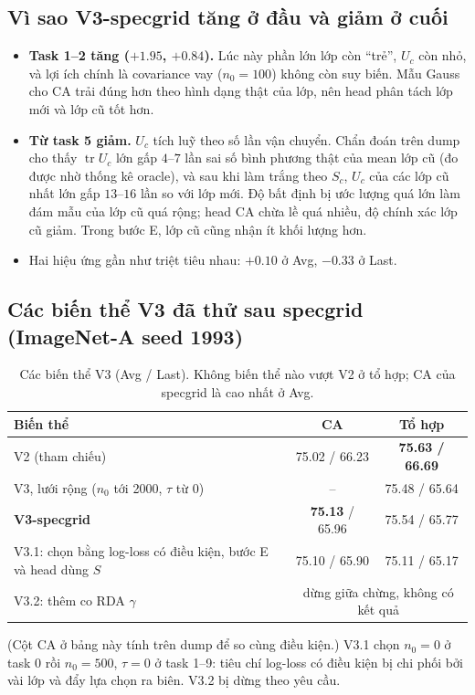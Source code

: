 \documentclass[11pt]{article}
\newcommand{\tr}{\operatorname{tr}}
\begin{document}
\subsection{Vì sao V3-specgrid tăng ở đầu và giảm ở cuối}\label{sec:why}
\begin{itemize}
\item \textbf{Task 1--2 tăng ($+1.95$, $+0.84$).} Lúc này phần lớn lớp còn ``trẻ'', $U_c$ còn nhỏ, và lợi ích chính là
      covariance vay ($n_0=100$) không còn suy biến. Mẫu Gauss cho CA trải đúng hơn theo hình dạng thật của lớp, nên head
      phân tách lớp mới và lớp cũ tốt hơn.
\item \textbf{Từ task 5 giảm.} $U_c$ tích luỹ theo số lần vận chuyển. Chẩn đoán trên dump cho thấy $\tr U_c$ lớn gấp
      $4$--$7$ lần sai số bình phương thật của mean lớp cũ (đo được nhờ thống kê oracle), và sau khi làm trắng theo
      $S_c$, $U_c$ của các lớp cũ nhất lớn gấp $13$--$16$ lần so với lớp mới. Độ bất định bị ước lượng quá lớn làm đám
      mẫu của lớp cũ quá rộng; head CA chừa lề quá nhiều, độ chính xác lớp cũ giảm. Trong bước E, lớp cũ cũng nhận ít
      khối lượng hơn.
\item Hai hiệu ứng gần như triệt tiêu nhau: $+0.10$ ở Avg, $-0.33$ ở Last.
\end{itemize}

\subsection{Các biến thể V3 đã thử sau specgrid (ImageNet-A seed 1993)}
\begin{table}[H]
\centering\small
\caption{Các biến thể V3 (Avg / Last). Không biến thể nào vượt V2 ở tổ hợp; CA của specgrid là cao nhất ở Avg.}
\begin{tabular}{lcc}
\toprule
Biến thể & CA & Tổ hợp \\
\midrule
V2 (tham chiếu) & 75.02 / 66.23 & \textbf{75.63 / 66.69} \\
V3, lưới rộng ($n_0$ tới 2000, $\tau$ từ 0) & -- & 75.48 / 65.64 \\
\textbf{V3-specgrid} & \textbf{75.13} / 65.96 & 75.54 / 65.77 \\
V3.1: chọn bằng log-loss có điều kiện, bước E và head dùng $S$ & 75.10 / 65.90 & 75.11 / 65.17 \\
V3.2: thêm co RDA $\gamma$ & \multicolumn{2}{c}{dừng giữa chừng, không có kết quả} \\
\bottomrule
\end{tabular}
\end{table}
(Cột CA ở bảng này tính trên dump để so cùng điều kiện.) V3.1 chọn $n_0=0$ ở task 0 rồi $n_0=500$, $\tau=0$ ở task 1--9:
tiêu chí log-loss có điều kiện bị chi phối bởi vài lớp và đẩy lựa chọn ra biên. V3.2 bị dừng theo yêu cầu.
\end{document}
